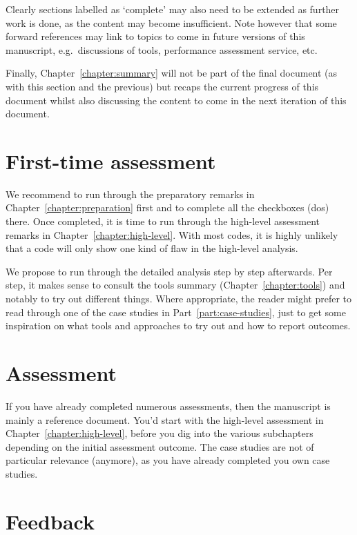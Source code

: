 Clearly sections labelled as `complete' may also need to be extended as further work is done, as the content may become insufficient. Note however that some forward references may link to topics to come in future versions of this manuscript, e.g.~discussions of tools, performance assessment service, etc. 

Finally, Chapter~\ref{chapter:summary} will not be part of the final document (as with this section and the previous) but recaps the current progress of this document whilst also discussing the content to come in the next iteration of this document. 

\section*{First-time assessment}

We recommend to run through the preparatory remarks in
Chapter~\ref{chapter:preparation} first and to complete all the checkboxes (dos)
there.
Once completed, it is time to run through the high-level assessment remarks in
Chapter~\ref{chapter:high-level}.
With most codes, it is highly unlikely that a code will only show one kind of
flaw in the high-level analysis. 

We propose to run through the detailed analysis step by step afterwards.
Per step, it makes sense to consult the tools summary
(Chapter~\ref{chapter:tools}) and notably to try out different things.
Where appropriate, the reader might prefer to read through one of the case
studies in Part~\ref{part:case-studies}, just to get some inspiration on what tools
and approaches to try out and how to report outcomes.



\section*{Assessment}

If you have already completed numerous assessments, then the manuscript is
mainly a reference document.
You'd start with the high-level assessment in Chapter~\ref{chapter:high-level},
before you dig into the various subchapters depending on the initial assessment
outcome.
The case studies are not of particular relevance (anymore), as you have already
completed you own case studies.


\section*{Feedback}

